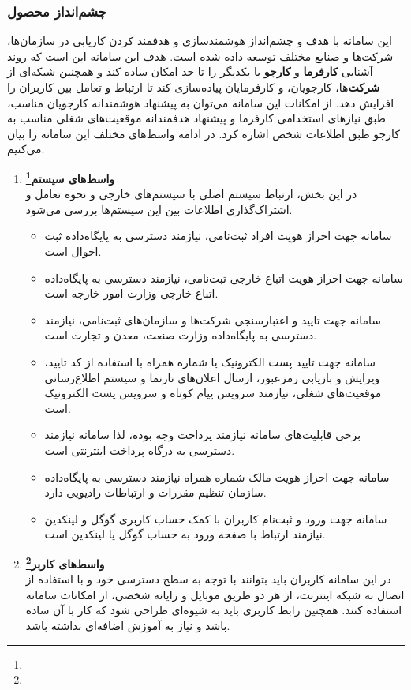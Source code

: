\documentclass[12pt]{article}
\begin{document}
	\subsubsection{چشم‌انداز محصول}
	این سامانه با هدف و چشم‌انداز هوشمند‌سازی و هدفمند کردن کاریابی در سازمان‌ها، شرکت‌ها و صنایع مختلف توسعه داده شده است. هدف این سامانه این است که روند آشنایی \textbf{کارفرما} و \textbf{کارجو} با یکدیگر را تا حد امکان ساده کند و همچنین شبکه‌ای از \textbf{شرکت}‌ها، کارجویان، و کارفرمایان پیاده‌سازی کند تا ارتباط و تعامل بین کاربران را افزایش دهد. از امکانات این سامانه می‌توان به پیشنهاد هوشمندانه کارجویان مناسب، طبق نیاز‌های استخدامی کارفرما و پیشنهاد هدفمندانه موقعیت‌های شغلی مناسب به کارجو طبق اطلاعات شخص اشاره کرد.
	در ادامه واسط‌های مختلف این سامانه را بیان می‌کنیم.
	\begin{enumerate}
		\item
		\textbf{واسط‌های سیستم\footnote{}}\\
		در این بخش، ارتباط سیستم اصلی با سیستم‌های خارجی و نحوه تعامل و اشتراک‌گذاری اطلاعات بین این سیستم‌ها بررسی می‌شود.
		\begin{itemize}
			\item
			سامانه جهت احراز هویت افراد ثبت‌نامی، نیازمند دسترسی به پایگاه‌داده ثبت احوال است.
			\item
			سامانه جهت احراز هویت اتباع خارجی ثبت‌نامی، نیازمند دسترسی به پایگاه‌داده اتباع خارجی وزارت امور خارجه است.
			\item
			سامانه جهت تایید و اعتبارسنجی شرکت‌ها و سازمان‌‌های ثبت‌نامی، نیازمند دسترسی به پایگاه‌داده وزارت صنعت، معدن و تجارت است.
			\item
			سامانه جهت تایید پست الکترونیک یا شماره همراه با استفاده از کد تایید، ویرایش و بازیابی رمز‌عبور، ارسال اعلان‌های تارنما و سیستم اطلاع‌رسانی موقعیت‌های شغلی،‌ نیازمند سرویس پیام کوتاه و سرویس پست الکترونیک است.
			\item
			برخی قابلیت‌های سامانه نیازمند پرداخت وجه بوده، لذا سامانه نیازمند دسترسی به درگاه پرداخت اینترنتی است.
			\item
			سامانه جهت احراز هویت مالک شماره همراه نیازمند دسترسی به پایگاه‌داده سازمان تنظیم مقررات و ارتباطات رادیویی دارد.
			\item
			سامانه جهت ورود و ثبت‌نام کاربران با کمک حساب کاربری گوگل و لینکدین نیازمند ارتباط با صفحه ورود به حساب گوگل یا لینکدین است.
		\end{itemize}
		\item
		\textbf{واسط‌های کاربر\footnote{}}\\
		در این سامانه کاربران باید بتوانند با توجه به سطح دسترسی خود و با استفاده از اتصال به شبکه اینترنت، از هر دو طریق موبایل و رایانه شخصی، از امکانات سامانه استفاده کنند. همچنین رابط کاربری باید به شیوه‌ای طراحی شود که کار با آن ساده باشد و نیاز به آموزش اضافه‌ای نداشته باشد.


\end{enumerate}
\end{document}

